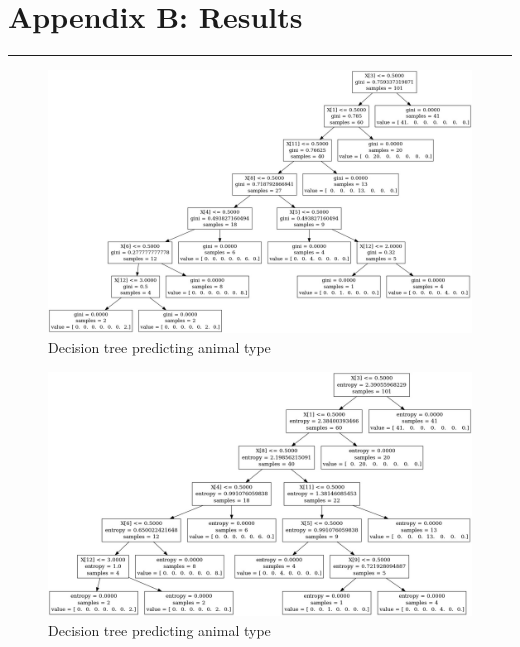 \documentclass[	DIV=calc,%
				paper=a4,%
				fontsize=11pt,%
				twocolumn]{scrartcl}	 %
\newcommand{\HorRule}{\color{brsublue}%
					 \rule{\linewidth}{1pt}%
					 \color{black}
					 }
\begin{document}
\newpage


\section*{Appendix B: Results}

\HorRule

\begin{figure}[h]
  \centering
  \caption{Decision tree predicting animal type}
  \label{7-1-gini}
  \includegraphics[width=1\textwidth]{./img/7-1-gini.jpg}
\end{figure}

\begin{figure}[h]
  \centering
  \caption{Decision tree predicting animal type}
  \label{7-1-entropy}
  \includegraphics[width=1\textwidth]{./img/7-1-entropy.jpg}
\end{figure}
\end{document}
